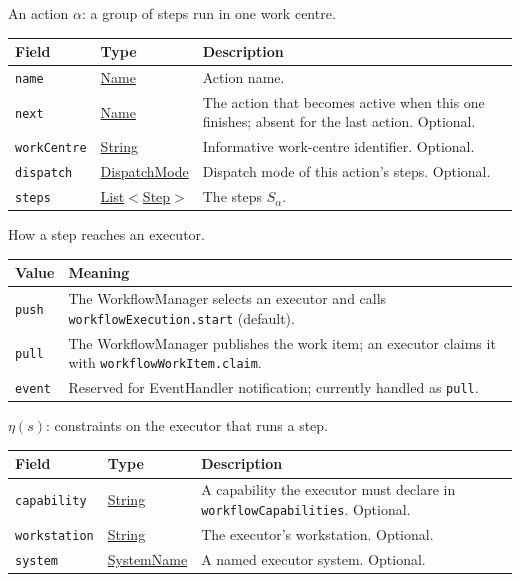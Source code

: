 \documentclass[a4paper]{arrowhead}
\newcommand{\mref}[1]{{\textcolor{ArrowheadPurple}{\hyperref[sec:model:#1]{#1}}}}
\newcommand{\pref}[1]{{\textcolor{ArrowheadGrey}{\hyperref[sec:model:primitives:#1]{#1}}}}
\begin{document}
An action $\alpha$: a group of steps run in one work centre.

{\small
\begin{longtable}{|p{3.9cm}|p{4.4cm}|p{7.5cm}|}

\hline
\rowcolor{gray!33} Field & Type & Description \\ \hline
\endhead
\texttt{name} & \pref{Name} & Action name. \\ \hline
\texttt{next} & \pref{Name} & The action that becomes active when this one finishes; absent for the last action. Optional. \\ \hline
\texttt{workCentre} & \pref{String} & Informative work-centre identifier. Optional. \\ \hline
\texttt{dispatch} & \mref{DispatchMode} & Dispatch mode of this action's steps. Optional. \\ \hline
\texttt{steps} & \pref{List}$<$\mref{Step}$>$ & The steps $S_\alpha$. \\ \hline
\end{longtable}
}

How a step reaches an executor.

{\small
\begin{longtable}{|p{3.9cm}|p{11.9cm}|}

\hline
\rowcolor{gray!33} Value & Meaning \\ \hline
\endhead
\texttt{push} & The WorkflowManager selects an executor and calls \texttt{workflowExecution.start} (default). \\ \hline
\texttt{pull} & The WorkflowManager publishes the work item; an executor claims it with \texttt{workflowWorkItem.claim}. \\ \hline
\texttt{event} & Reserved for EventHandler notification; currently handled as \texttt{pull}. \\ \hline
\end{longtable}
}

$\eta(s)$: constraints on the executor that runs a step.

{\small
\begin{longtable}{|p{3.9cm}|p{4.4cm}|p{7.5cm}|}

\hline
\rowcolor{gray!33} Field & Type & Description \\ \hline
\endhead
\texttt{capability} & \pref{String} & A capability the executor must declare in \texttt{workflowCapabilities}. Optional. \\ \hline
\texttt{workstation} & \pref{String} & The executor's workstation. Optional. \\ \hline
\texttt{system} & \pref{SystemName} & A named executor system. Optional. \\ \hline
\end{longtable}
}
\end{document}
